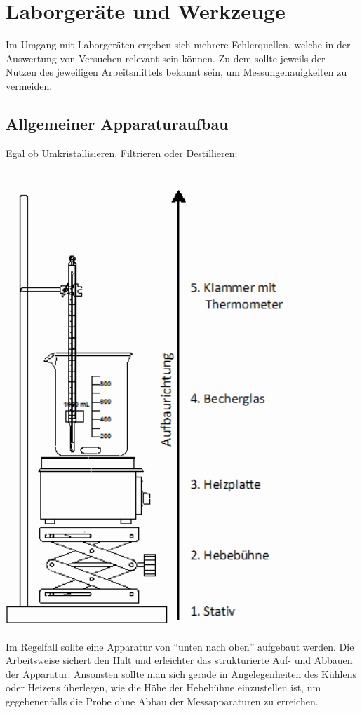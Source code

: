 \section{Laborgeräte und Werkzeuge}
Im Umgang mit Laborgeräten ergeben sich mehrere Fehlerquellen, welche in der Auswertung von Versuchen relevant sein können. Zu dem sollte jeweils der Nutzen des jeweiligen Arbeitsmittels bekannt sein, um Messungenauigkeiten zu vermeiden.



\subsection{Allgemeiner Apparaturaufbau}
Egal ob Umkristallisieren, Filtrieren oder Destillieren:\\ \\
\begin{minipage}{0.45\textwidth}
	\includegraphics[width=0.8\textwidth]{img/Grundaufbau_Apparatur.png}
\end{minipage}
\begin{minipage}{0.55\textwidth}
		 Im Regelfall sollte eine Apparatur von "`unten nach oben"' aufgebaut werden. Die Arbeitsweise sichert den Halt und erleichter das strukturierte Auf- und Abbauen der Apparatur.
		 Ansonsten sollte man sich gerade in Angelegenheiten des Kühlens oder Heizens überlegen, wie die Höhe der Hebebühne einzustellen ist, um gegebenenfalls die Probe ohne Abbau der Messapparaturen zu erreichen.
\end{minipage}

